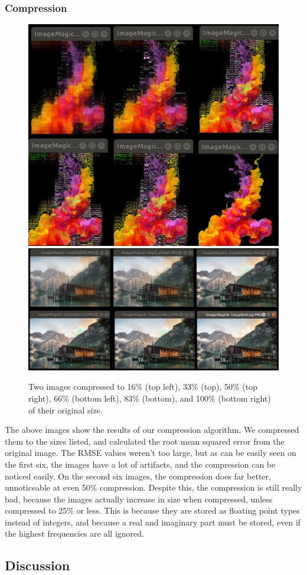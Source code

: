 	\subsubsection{Compression}
		\begin{figure}[h]
			\includegraphics[width=\linewidth]{images/imgCompare1.png}
			\includegraphics[width=\linewidth]{images/imgCompare2.png}
			\caption{Two images compressed to 16\% (top left), 33\% (top), 50\% (top right), 66\% (bottom left), 83\% (bottom), and 100\% (bottom right) of their original size.}
		\end{figure}
		The above images show the results of our compression algorithm. We compressed them to the sizes listed, and calculated the root mean squared error from the original image. The RMSE values weren't too large, but as can be easily seen on the first six, the images have a lot of artifacts, and the compression can be noticed easily. On the second six images, the compression does far better, unnoticeable at even 50\% compression. Despite this, the compression is still really bad, because the images actually increase in size when compressed, unless compressed to 25\% or less. This is because they are stored as floating point types instead of integers, and because a real and imaginary part must be stored, even if the highest frequencies are all ignored.
\subsection{Discussion}
